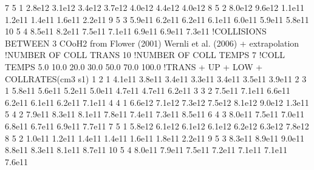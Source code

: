 \documentclass[letterpaper,10pt,english]{sphinxmanual}
\begin{document}
\begin{sphinxVerbatim}[commandchars=\\\{\}]
    7     5     1  2.8e\PYGZhy{}12 3.1e\PYGZhy{}12 3.4e\PYGZhy{}12 3.7e\PYGZhy{}12 4.0e\PYGZhy{}12 4.4e\PYGZhy{}12 4.0e\PYGZhy{}12
    8     5     2  8.0e\PYGZhy{}12 9.6e\PYGZhy{}12 1.1e\PYGZhy{}11 1.2e\PYGZhy{}11 1.4e\PYGZhy{}11 1.6e\PYGZhy{}11 2.2e\PYGZhy{}11
    9     5     3  5.9e\PYGZhy{}11 6.2e\PYGZhy{}11 6.2e\PYGZhy{}11 6.1e\PYGZhy{}11 6.0e\PYGZhy{}11 5.9e\PYGZhy{}11 5.8e\PYGZhy{}11
   10     5     4  8.5e\PYGZhy{}11 8.2e\PYGZhy{}11 7.5e\PYGZhy{}11 7.1e\PYGZhy{}11 6.9e\PYGZhy{}11 6.9e\PYGZhy{}11 7.3e\PYGZhy{}11
!COLLISIONS BETWEEN
3 CO\PYGZhy{}oH2 from Flower (2001) \PYGZam{} Wernli et al. (2006) + extrapolation
!NUMBER OF COLL TRANS
10
!NUMBER OF COLL TEMPS
7
!COLL TEMPS
    5.0   10.0   20.0   30.0   50.0   70.0  100.0
!TRANS + UP + LOW + COLLRATES(cm\PYGZca{}3 s\PYGZca{}\PYGZhy{}1)
    1     2     1  4.1e\PYGZhy{}11 3.8e\PYGZhy{}11 3.4e\PYGZhy{}11 3.3e\PYGZhy{}11 3.4e\PYGZhy{}11 3.5e\PYGZhy{}11 3.9e\PYGZhy{}11
    2     3     1  5.8e\PYGZhy{}11 5.6e\PYGZhy{}11 5.2e\PYGZhy{}11 5.0e\PYGZhy{}11 4.7e\PYGZhy{}11 4.7e\PYGZhy{}11 6.2e\PYGZhy{}11
    3     3     2  7.5e\PYGZhy{}11 7.1e\PYGZhy{}11 6.6e\PYGZhy{}11 6.2e\PYGZhy{}11 6.1e\PYGZhy{}11 6.2e\PYGZhy{}11 7.1e\PYGZhy{}11
    4     4     1  6.6e\PYGZhy{}12 7.1e\PYGZhy{}12 7.3e\PYGZhy{}12 7.5e\PYGZhy{}12 8.1e\PYGZhy{}12 9.0e\PYGZhy{}12 1.3e\PYGZhy{}11
    5     4     2  7.9e\PYGZhy{}11 8.3e\PYGZhy{}11 8.1e\PYGZhy{}11 7.8e\PYGZhy{}11 7.4e\PYGZhy{}11 7.3e\PYGZhy{}11 8.5e\PYGZhy{}11
    6     4     3  8.0e\PYGZhy{}11 7.5e\PYGZhy{}11 7.0e\PYGZhy{}11 6.8e\PYGZhy{}11 6.7e\PYGZhy{}11 6.9e\PYGZhy{}11 7.7e\PYGZhy{}11
    7     5     1  5.8e\PYGZhy{}12 6.1e\PYGZhy{}12 6.1e\PYGZhy{}12 6.1e\PYGZhy{}12 6.2e\PYGZhy{}12 6.3e\PYGZhy{}12 7.8e\PYGZhy{}12
    8     5     2  1.0e\PYGZhy{}11 1.2e\PYGZhy{}11 1.4e\PYGZhy{}11 1.4e\PYGZhy{}11 1.6e\PYGZhy{}11 1.8e\PYGZhy{}11 2.2e\PYGZhy{}11
    9     5     3  8.3e\PYGZhy{}11 8.9e\PYGZhy{}11 9.0e\PYGZhy{}11 8.8e\PYGZhy{}11 8.3e\PYGZhy{}11 8.1e\PYGZhy{}11 8.7e\PYGZhy{}11
   10     5     4  8.0e\PYGZhy{}11 7.9e\PYGZhy{}11 7.5e\PYGZhy{}11 7.2e\PYGZhy{}11 7.1e\PYGZhy{}11 7.1e\PYGZhy{}11 7.6e\PYGZhy{}11
\end{sphinxVerbatim}
\end{document}
